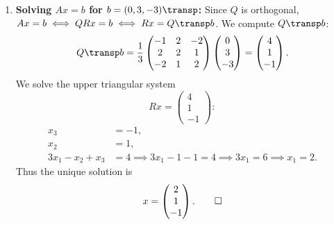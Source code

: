 \begin{exercisesolution*}
\begin{enumerate}[label=\textbf{(\alph*)}]
\begin{itemize}
\[        \]
        \[
        R_{33} = \|w_3\| = \frac{1}{3}\sqrt{4 + 1 + 4} = 1 \implies e_3 = \frac{1}{3}\begin{pmatrix} -2 \\ 1 \\ 2 \end{pmatrix}.
        \]
    \end{itemize}
    Thus the $QR$-decomposition is:
    \[
    Q = \frac{1}{3}\begin{pmatrix} -1 & 2 & -2 \\ 2 & 2 & 1 \\ -2 & 1 & 2 \end{pmatrix}, \qquad
    R = \begin{pmatrix} 3 & -1 & 1 \\ 0 & 1 & 0 \\ 0 & 0 & 1 \end{pmatrix}.
    \]

    \item \textbf{Solving $Ax = b$ for $b = (0, 3, -3)\transp$:}
    Since $Q$ is orthogonal, $Ax = b \iff QRx = b \iff Rx = Q\transp b$.
    We compute $Q\transp b$:
    \[
    Q\transp b = \frac{1}{3}\begin{pmatrix} -1 & 2 & -2 \\ 2 & 2 & 1 \\ -2 & 1 & 2 \end{pmatrix} \begin{pmatrix} 0 \\ 3 \\ -3 \end{pmatrix} = \begin{pmatrix} 4 \\ 1 \\ -1 \end{pmatrix}.
    \]
    We solve the upper triangular system
    \[
    Rx = \begin{pmatrix} 4 \\ 1 \\ -1 \end{pmatrix}:
    \]
    \begin{align*}
    x_3 &= -1, \\
    x_2 &= 1, \\
    3x_1 - x_2 + x_3 &= 4 \implies 3x_1 - 1 - 1 = 4 \implies 3x_1 = 6 \implies x_1 = 2.
    \end{align*}
    Thus the unique solution is
    \[
    x = \begin{pmatrix} 2 \\ 1 \\ -1 \end{pmatrix}. \qedhere
    \]
\end{enumerate}
\end{exercisesolution*}
